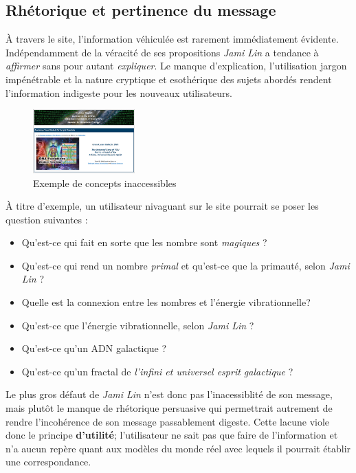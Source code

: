\documentclass[9pt]{report}
\begin{document}
\begin{multicols*}{2}
  \subsection{Rhétorique et pertinence du message}
  À travers le site, l'information véhiculée est rarement immédiatement 
  évidente. Indépendamment de la véracité de ses propositions
  \textit{Jami Lin}  a tendance à \textit{affirmer} sans pour 
  autant \textit{expliquer}. Le manque d'explication, l'utilisation 
  jargon impénétrable et la nature cryptique et esothérique 
  des sujets abordés rendent l'information indigeste pour les nouveaux 
  utilisateurs. 
  \begin{figure}[H]
    \begin{center}
      \includegraphics[width=0.35\textwidth]{PertinenceMessage.png}
    \end{center}
    \caption{Exemple de concepts inaccessibles}
  \end{figure} 
  À titre d'exemple, un utilisateur nivaguant sur le site pourrait 
  se poser les question suivantes : 
  \begin{itemize}
    \item Qu'est-ce qui fait en sorte que les nombre sont \textit{magiques} ?   
    \item Qu'est-ce qui rend un nombre \textit{primal} et qu'est-ce 
      que la primauté, selon \textit{Jami Lin} ?
    \item Quelle est la connexion entre les nombres et l'énergie vibrationnelle?
    \item Qu'est-ce que l'énergie vibrationnelle, selon \textit{Jami Lin} ?  
    \item Qu'est-ce qu'un ADN galactique ?
    \item Qu'est-ce qu'un fractal de \textit{l'infini et universel esprit galactique} ?  
  \end{itemize}

  Le plus gros défaut de \textit{Jami Lin} n'est donc pas 
  l'inacessiblité de son message, mais plutôt le manque 
  de rhétorique persuasive qui permettrait autrement de 
  rendre l'incohérence de son message passablement digeste. Cette 
  lacune viole donc le principe \textbf{d'utilité}; l'utilisateur 
  ne sait pas que faire de l'information et n'a aucun repère 
  quant aux modèles du monde réel avec lequels il pourrait 
  établir une correspondance. 


\end{multicols*}
\end{document}
